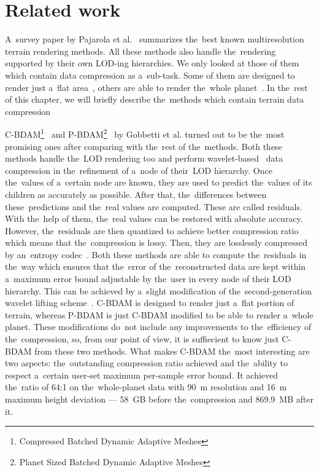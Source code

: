 \chapter{Related work}\label{chap:related_works}

 A~survey paper by Pajarola et al.~\cite{survey} summarizes the~best known multiresolution terrain rendering methods. All these methods also handle the~rendering supported by their own LOD-ing hierarchies. We only looked at those of them which contain data compression as a~sub-task. Some of them are designed to render just a~flat area~\cite{cbdam, jpeg2000terrain, meshesGPU1, meshesGPU2}, others are able to render the~whole planet~\cite{pbdam, meshes}. In the~rest of this chapter, we will briefly describe the~methods which contain terrain data compression
 
 C-BDAM\footnote{Compressed Batched Dynamic Adaptive Meshes}~\cite{cbdam} and P-BDAM\footnote{Planet Sized Batched Dynamic Adaptive Meshes}~\cite{pbdam} by Gobbetti et al. turned out to be the~most promising ones after comparing with the~rest of the~methods. Both these methods handle the~LOD rendering too and perform wavelet-based~\cite{waveletsTutorial} data compression in the~refinement of a~node of their~LOD hierarchy. Once the~values of a~certain node are known, they are used to predict the~values of its children as accurately as possible. After that, the~differences between these~predictions and the~real values are computed. These are called residuals. With the~help of them, the~real values can be restored with absolute accuracy. However, the~residuals are then quantized to achieve better compression ratio which means that the~compression is lossy. Then, they are losslessly compressed by an~entropy codec~\cite{entropy1, entropy2}. Both these methods are able to compute the~residuals in the~way which ensures that the~error of the~reconstructed data are kept within a~maximum error bound adjustable by the~user in every node of their LOD hierarchy. This can be achieved by a~slight modification of the~second-generation wavelet lifting scheme~\cite{two-stage}. C-BDAM is designed to render just a~flat portion of terrain, whereas P-BDAM is just C-BDAM modified to be able to render a~whole planet. These modifications do~not include any improvements to the~efficiency of the~compression, so, from our point of view, it is suffiecient to know just C-BDAM from these two methods. What makes C-BDAM the~most interesting are two aspects: the~outstanding compression ratio achieved and the~ability to respect a~certain user-set maximum per-sample error bound. It achieved the~ratio of 64:1 on the~whole-planet data with 90~m resolution and 16~m maximum height deviation --- 58~GB before the~compression and 869.9~MB after it.
 

